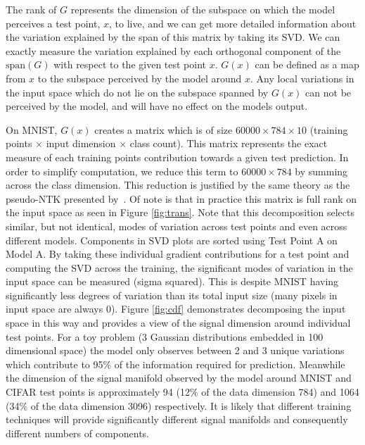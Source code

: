 The rank of $G$ represents the dimension of the subspace on which the model perceives a test point, $x$, to live, and we can get more detailed information about the variation explained by the span of this matrix by taking its SVD. We can exactly measure the variation explained by each orthogonal component of the $\text{span}(G)$ with respect to the given test point $x$. $G(x)$ can be defined as a map from $x$ to the subspace perceived by the model around $x$. Any local variations in the input space which do not lie on the subspace spanned by $G(x)$ can not be perceived by the model, and will have no effect on the models output.

On MNIST, $G(x)$ creates a matrix which is of size $60000 \times 784 \times 10$ (training points $\times$ input dimension $\times$ class count).
This matrix represents the exact measure of each training points contribution towards a given test prediction.
In order to simplify computation, we reduce this term to $60000 \times 784$ by summing across the class dimension.
This reduction is justified by the same theory as the pseudo-NTK presented by~\citet{pmlr-v202-mohamadi23a}.
Of note is that in practice this matrix is full rank on the input space as seen in Figure \ref{fig:trans}. Note that this decomposition selects similar, but not identical, modes of variation across test points and even across different models. Components in SVD plots are sorted using Test Point A on Model A. By taking these individual gradient contributions for a test point and computing the SVD across the training, the significant modes of variation in the input space can be measured (sigma squared). 
This is despite MNIST having significantly less degrees of variation than its total input size (many pixels in input space are always 0).
Figure \ref{fig:cdf} demonstrates decomposing the input space in this way and provides a view of the signal dimension around individual test points. For a toy problem (3 Gaussian distributions embedded in 100 dimensional space) the model only observes between 2 and 3 unique variations which contribute to 95\% of the information required for prediction. Meanwhile the dimension of the signal manifold observed by the model around MNIST and CIFAR test points is approximately 94 (12\% of the data dimension 784) and 1064 (34\% of the data dimension 3096) respectively. It is likely that different training techniques will provide significantly different signal manifolds and consequently different numbers of components.
